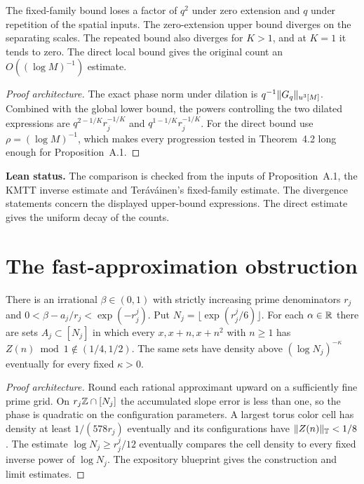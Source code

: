 \begin{lemma}\label{checked-separating-comparison}
\leanok
{}
The fixed-family bound loses a factor of $q^2$ under zero
extension and $q$ under repetition of the spatial inputs. The
zero-extension upper bound diverges on the separating scales.
The repeated bound also diverges for $K>1$, and at $K=1$ it
tends to zero. The direct local bound gives the original count
an $O((\log M)^{-1})$ estimate.
\end{lemma}
\begin{proof}[Proof architecture]
\leanok
The exact phase norm under dilation is $q^{-1}\lVert G_q\rVert_{u^3[M]}$.
Combined with the global lower bound, the powers controlling the
two dilated expressions are $q^{2-1/K}r_j^{-1/K}$ and
$q^{1-1/K}r_j^{-1/K}$. For the direct bound use
$\rho=(\log M)^{-1}$, which makes every progression tested in
Theorem~4.2 long enough for Proposition~A.1.
\end{proof}
\noindent\textbf{Lean status.} The comparison is checked from
the inputs of Proposition~A.1, the KMTT inverse estimate and
Ter\'av\'ainen's fixed-family estimate. The divergence statements
concern the displayed upper-bound expressions. The direct
estimate gives the uniform decay of the counts.


\section{The fast-approximation obstruction}

\begin{proposition}\label{checked-intro-fast-obstruction}
\leanok
There is an irrational $\beta\in(0,1)$ with strictly increasing prime
denominators $r_j$ and $0<\beta-a_j/r_j<\exp(-r_j^j)$.
Put $N_j=\lfloor\exp(r_j^j/6)\rfloor$. For each $\alpha\in\mathbb R$ there are sets
$A_j\subset[N_j]$ in which every $x,x+n,x+n^2$ with $n\ge1$ has
$Z(n)\bmod 1\notin(1/4,1/2)$. The same sets have density above
$(\log N_j)^{-\kappa}$ eventually for every fixed $\kappa>0$.
\end{proposition}
\begin{proof}[Proof architecture]
\leanok
Round each rational approximant upward on a sufficiently fine prime
grid. On $r_j\mathbb Z\cap[N_j]$ the accumulated slope error is less than one,
so the phase is quadratic on the configuration parameters.
A largest torus color cell has density at least $1/(578r_j)$
eventually and its configurations have $\lVert Z(n)\rVert_{\mathbb T}<1/8$.
The estimate $\log N_j\ge r_j^j/12$ eventually compares the cell
density to every fixed inverse power of $\log N_j$. The expository
blueprint gives the construction and limit estimates.
\end{proof}

